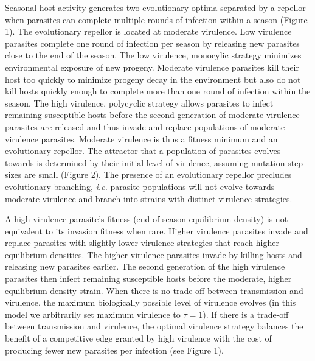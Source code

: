 \documentclass{article}
\begin{document}
Seasonal host activity generates two evolutionary optima separated by a repellor when parasites can complete multiple rounds of infection within a season (Figure 1). The evolutionary repellor is located at moderate virulence. Low virulence parasites complete one round of infection per season by releasing new parasites close to the end of the season. The low virulence, monocylic strategy minimizes environmental exposure of new progeny. Moderate virulence parasites kill their host too quickly to minimize progeny decay in the environment but also do not kill hosts quickly enough to complete more than one round of infection within the season. The high virulence, polycyclic strategy allows parasites to infect remaining susceptible hosts before the second generation of moderate virulence parasites are released and thus invade and replace populations of moderate virulence parasites. Moderate virulence is thus a fitness minimum and an evolutionary repellor. The attractor that a population of parasites evolves towards is determined by their initial level of virulence, assuming mutation step sizes are small (Figure 2). The presence of an evolutionary repellor precludes evolutionary branching, \textit{i.e.} parasite populations will not evolve towards moderate virulence and branch into strains with distinct virulence strategies.

A high virulence parasite's fitness (end of season equilibrium density) is not equivalent to its invasion fitness when rare. Higher virulence parasites invade and replace parasites with slightly lower virulence strategies that reach higher equilibrium densities. The higher virulence parasites invade by killing hosts and releasing new parasites earlier. The second generation of the high virulence parasites then infect remaining susceptible hosts before the moderate, higher equilibrium density strain. When there is no trade-off between transmission and virulence, the maximum biologically possible level of virulence evolves (in this model we arbitrarily set maximum virulence to $\tau=1$). If there is a trade-off between transmission and virulence, the optimal virulence strategy balances the benefit of a competitive edge granted by high virulence with the cost of producing fewer new parasites per infection (see Figure 1).
\end{document}
